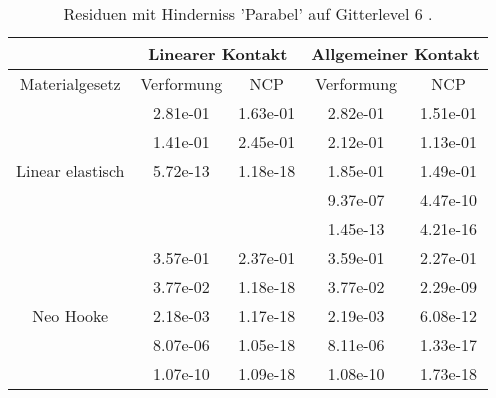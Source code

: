 \begin{table} 
\centering 
\begin{tabular}{c|cc|cc|} 
\cline{2-5} 
 & \multicolumn{2}{|c|}{Linearer Kontakt} & \multicolumn{2}{|c|}{Allgemeiner Kontakt} \\ 
\hline 
\multicolumn{1}{|c|}{Materialgesetz} & \multicolumn{1}{c|}{Verformung} & \multicolumn{1}{c|}{NCP} & \multicolumn{1}{c|}{Verformung} & \multicolumn{1}{c|}{NCP} \\ 
\hline 
\multicolumn{1}{|c|}{\multirow{5}{*}{Linear elastisch}} &\multicolumn{1}{|c|}{  2.81e-01} & \multicolumn{1}{|c|}{  1.63e-01} & \multicolumn{1}{|c|}{  2.82e-01} & \multicolumn{1}{|c|}{  1.51e-01} \\ 
\multicolumn{1}{|c|}{} & \multicolumn{1}{|c|}{  1.41e-01} & \multicolumn{1}{|c|}{  2.45e-01} & \multicolumn{1}{|c|}{  2.12e-01} & \multicolumn{1}{|c|}{  1.13e-01} \\ 
\multicolumn{1}{|c|}{} & \multicolumn{1}{|c|}{  5.72e-13} & \multicolumn{1}{|c|}{  1.18e-18} & \multicolumn{1}{|c|}{  1.85e-01} & \multicolumn{1}{|c|}{  1.49e-01} \\ 
\multicolumn{1}{|c|}{} & \multicolumn{1}{|c|}{} & \multicolumn{1}{|c|}{} & \multicolumn{1}{|c|}{  9.37e-07} & \multicolumn{1}{|c|}{  4.47e-10} \\ 
\multicolumn{1}{|c|}{} & \multicolumn{1}{|c|}{} & \multicolumn{1}{|c|}{} & \multicolumn{1}{|c|}{  1.45e-13} & \multicolumn{1}{|c|}{  4.21e-16} \\ 
\hline 
\multicolumn{1}{|c|}{\multirow{5}{*}{Neo Hooke}} &\multicolumn{1}{|c|}{  3.57e-01} & \multicolumn{1}{|c|}{  2.37e-01} & \multicolumn{1}{|c|}{  3.59e-01} & \multicolumn{1}{|c|}{  2.27e-01} \\ 
\multicolumn{1}{|c|}{} & \multicolumn{1}{|c|}{  3.77e-02} & \multicolumn{1}{|c|}{  1.18e-18} & \multicolumn{1}{|c|}{  3.77e-02} & \multicolumn{1}{|c|}{  2.29e-09} \\ 
\multicolumn{1}{|c|}{} & \multicolumn{1}{|c|}{  2.18e-03} & \multicolumn{1}{|c|}{  1.17e-18} & \multicolumn{1}{|c|}{  2.19e-03} & \multicolumn{1}{|c|}{  6.08e-12} \\ 
\multicolumn{1}{|c|}{} & \multicolumn{1}{|c|}{  8.07e-06} & \multicolumn{1}{|c|}{  1.05e-18} & \multicolumn{1}{|c|}{  8.11e-06} & \multicolumn{1}{|c|}{  1.33e-17} \\ 
\multicolumn{1}{|c|}{} & \multicolumn{1}{|c|}{  1.07e-10} & \multicolumn{1}{|c|}{  1.09e-18} & \multicolumn{1}{|c|}{  1.08e-10} & \multicolumn{1}{|c|}{  1.73e-18} \\ 
\hline 
\end{tabular}\caption{Residuen mit Hinderniss 'Parabel' auf Gitterlevel 6 .}\label{tab:Residuum_Parabel_level6}
\end{table} 
